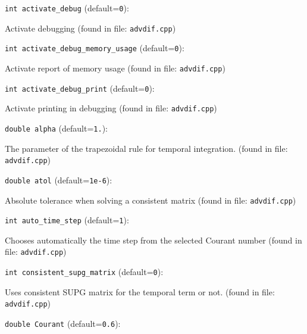 \item\verb+int activate_debug+ {\rm(default=\verb|0|)}:

Activate debugging
 (found in file: \verb+advdif.cpp+)
\item\verb+int activate_debug_memory_usage+ {\rm(default=\verb|0|)}:

Activate report of memory usage
 (found in file: \verb+advdif.cpp+)
\item\verb+int activate_debug_print+ {\rm(default=\verb|0|)}:

Activate printing in debugging
 (found in file: \verb+advdif.cpp+)
\item\verb+double alpha+ {\rm(default=\verb|1.|)}:

The parameter of the trapezoidal rule
for temporal integration. 
 (found in file: \verb+advdif.cpp+)
\item\verb+double atol+ {\rm(default=\verb|1e-6|)}:

Absolute tolerance when solving a consistent matrix
 (found in file: \verb+advdif.cpp+)
\item\verb+int auto_time_step+ {\rm(default=\verb|1|)}:

Chooses automatically the time step from the 
selected Courant number
 (found in file: \verb+advdif.cpp+)
\item\verb+int consistent_supg_matrix+ {\rm(default=\verb|0|)}:

Uses consistent SUPG matrix for the temporal term or not. 
 (found in file: \verb+advdif.cpp+)
\item\verb+double Courant+ {\rm(default=\verb|0.6|)}:

